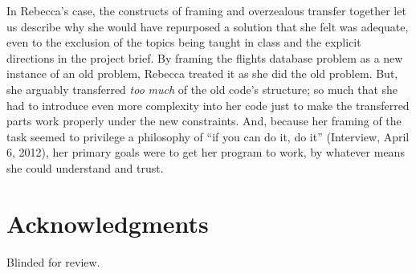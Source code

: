 In Rebecca's case, the constructs of framing and overzealous transfer
together let us describe why she would have repurposed a solution that
she felt was adequate, even to the exclusion of the topics being taught
in class and the explicit directions in the project brief. By framing
the flights database problem as a new instance of an old problem,
Rebecca treated it as she did the old problem. But, she arguably
transferred \emph{too} \emph{much} of the old code's structure; so much
that she had to introduce even more complexity into her code just to
make the transferred parts work properly under the new constraints. And,
because her framing of the task seemed to privilege a philosophy of ``if
you can do it, do it'' (Interview, April 6, 2012), her primary goals
were to get her program to work, by whatever means she could understand
and trust.

\section{Acknowledgments}\label{acknowledgments}

Blinded for review.

\clearpage



